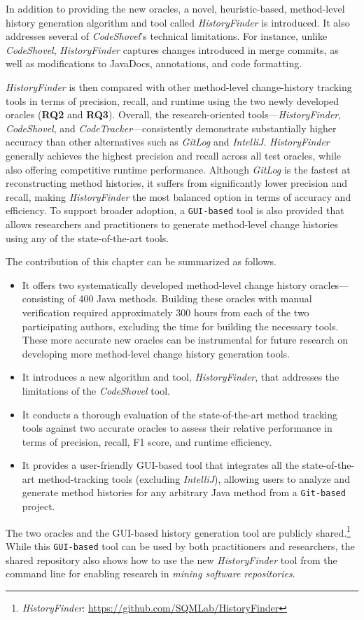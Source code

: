 In addition to providing the new oracles, a novel, heuristic-based, method-level history generation algorithm and tool called \textit{HistoryFinder} is introduced. It also addresses several of \textit{CodeShovel}'s technical limitations. For instance, unlike \textit{CodeShovel}, \textit{HistoryFinder} captures changes introduced in merge commits, as well as modifications to JavaDocs, annotations, and code formatting.

\textit{HistoryFinder} is then compared with other method-level change-history tracking tools in terms of precision, recall, and runtime using the two newly developed oracles (\textbf{RQ2} and \textbf{RQ3}). Overall, the research-oriented tools—\textit{HistoryFinder}, \textit{CodeShovel}, and \textit{CodeTracker}—consistently demonstrate substantially higher accuracy than other alternatives such as \textit{GitLog} and \textit{IntelliJ}. \textit{HistoryFinder} generally achieves the highest precision and recall across all test oracles, while also offering competitive runtime performance. Although \textit{GitLog} is the fastest at reconstructing method histories, it suffers from significantly lower precision and recall, making \textit{HistoryFinder} the most balanced option in terms of accuracy and efficiency. To support broader adoption, a \texttt{GUI-based} tool is also provided that allows researchers and practitioners to generate method-level change histories using any of the state-of-the-art tools.

The contribution of this chapter can be summarized as follows.
\begin{itemize}
    \item It offers two systematically developed method-level change history oracles---consisting of 400 Java methods. Building these oracles with manual verification required approximately 300 hours from each of the two participating authors, excluding the time for building the necessary tools. These more accurate new oracles can be instrumental for future research on developing more method-level change history generation tools.
    \item It introduces a new algorithm and tool, \textit{HistoryFinder}, that addresses the limitations of the \textit{CodeShovel} tool.
    \item It conducts a thorough evaluation of the state-of-the-art method tracking tools against two accurate oracles to assess their relative performance in terms of precision, recall, F1 score, and runtime efficiency.
    \item It provides a user-friendly GUI-based tool that integrates all the state-of-the-art method-tracking tools (excluding \textit{IntelliJ}), allowing users to analyze and generate method histories for any arbitrary Java method from a \texttt{Git-based} project.
\end{itemize}

The two oracles and the GUI-based history generation tool are publicly shared.\footnote{\textit{HistoryFinder}: \url{https://github.com/SQMLab/HistoryFinder}} While this \texttt{GUI-based} tool can be used by both practitioners and researchers, the shared repository also shows how to use the new \textit{HistoryFinder} tool from the command line for enabling research in \emph{mining software repositories}.
